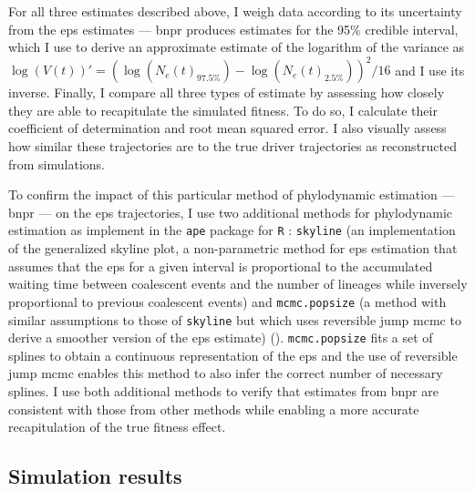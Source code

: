 For all three estimates described above, I weigh data according to its uncertainty from the \ac{eps} estimates --- \ac{bnpr} produces estimates for the 95\% credible interval, which I use to derive an approximate estimate of the logarithm of the variance as $\log(V(t))' = (\log(N_e(t)_{97.5\%}) - \log(N_e(t)_{2.5\%}))^2/16$ and I use its inverse. Finally, I compare all three types of estimate by assessing how closely they are able to recapitulate the simulated fitness. To do so, I calculate their coefficient of determination and root mean squared error. I also visually assess how similar these trajectories are to the true driver trajectories as reconstructed from simulations.

To confirm the impact of this particular method of phylodynamic estimation --- \ac{bnpr} --- on the \ac{eps} trajectories, I use two additional methods for phylodynamic estimation as implement in the \texttt{ape} package for \texttt{R} \cite{Paradis2019-na}: \texttt{skyline} (an implementation of the generalized skyline plot, a non-parametric method for \ac{eps} estimation that assumes that the \ac{eps} for a given interval is proportional to the accumulated waiting time between coalescent events and the number of lineages while inversely proportional to previous coalescent events) and \texttt{mcmc.popsize} (a method with similar assumptions to those of \texttt{skyline} but which uses reversible jump \ac{mcmc} to derive a smoother version of the \ac{eps} estimate) \cite{Opgen-Rhein2005-pi} (). \texttt{mcmc.popsize} fits a set of splines to obtain a continuous representation of the \ac{eps} and the use of reversible jump \ac{mcmc} enables this method to also infer the correct number of necessary splines. I use both additional methods to verify that estimates from \ac{bnpr} are consistent with those from other methods while enabling a more accurate recapitulation of the true fitness effect.

\begin{figure}[!ht]
	\label{fig:examples-phylo-traj}
\end{figure}

\subsection{Simulation results}

